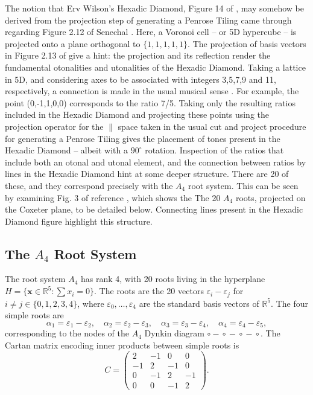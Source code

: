 \documentclass[11pt]{article}
\begin{document}
The notion that Erv Wilson's Hexadic Diamond, Figure 14 of \cite{wilson1989} , may somehow be derived from the projection step of generating a Penrose Tiling came through regarding Figure 2.12 of Senechal \cite{senechal1995}. Here, a Voronoi cell -- or 5D hypercube -- is projected onto a plane orthogonal to $\{1,1,1,1,1\}$.    The projection of basis vectors in Figure 2.13 of \cite{senechal1995} give a hint: the projection and its reflection render the fundamental otonalities and utonalities of the Hexadic Diamond. Taking a lattice in 5D, and considering axes to be associated with integers 3,5,7,9 and 11, respectively, a connection is made in the usual musical sense \cite{Benson}.  For example, the point (0,-1,1,0,0) corresponds to the ratio 7/5. Taking only the resulting ratios included in the Hexadic Diamond and projecting these points using the projection operator for the $\parallel$ space taken in the usual cut and project procedure for generating a Penrose Tiling gives the placement of tones present in the Hexadic Diamond -- albeit with a $90^\circ$ rotation.  Inspection of the ratios that include both an otonal and utonal element, and the connection between ratios by lines in the Hexadic Diamond hint at some deeper structure.  There are 20 of these, and they correspond precisely with the $A_4$ root system. This can be seen by examining Fig. 3 of reference \cite{boyleSteinhardt2022}, which shows the The 20 $A_4$ roots, projected on the Coxeter plane, to be detailed below. Connecting lines present in the Hexadic Diamond figure highlight this structure.

\color{blue}
\subsection{The $A_4$ Root System}

The root system $A_4$ has rank 4, with 20 roots living in the hyperplane
$H = \{\mathbf{x} \in \mathbb{R}^5 : \sum x_i = 0\}$. The roots are the
20 vectors $\varepsilon_i - \varepsilon_j$ for $i \neq j \in \{0,1,2,3,4\}$,
where $\varepsilon_0, \ldots, \varepsilon_4$ are the standard basis vectors
of $\mathbb{R}^5$. The four simple roots are
\[
  \alpha_1 = \varepsilon_1 - \varepsilon_2, \quad
  \alpha_2 = \varepsilon_2 - \varepsilon_3, \quad
  \alpha_3 = \varepsilon_3 - \varepsilon_4, \quad
  \alpha_4 = \varepsilon_4 - \varepsilon_5,
\]
corresponding to the nodes of the $A_4$ Dynkin diagram $\circ\!-\!\circ\!-\!\circ\!-\!\circ$.
The Cartan matrix encoding inner products between simple roots is
\[
  C = \begin{pmatrix}
    2 & -1 & 0 & 0 \\
   -1 &  2 &-1 & 0 \\
    0 & -1 & 2 &-1 \\
    0 &  0 &-1 & 2
  \end{pmatrix}.
\]
\end{document}
